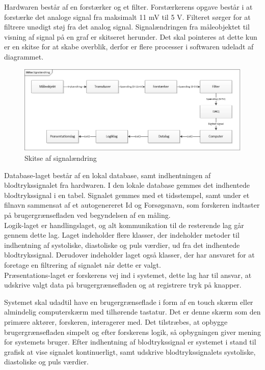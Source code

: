 Hardwaren består af en forstærker og et filter. Forstærkerens opgave består i at forstærke det analoge signal fra maksimalt 11 mV til 5 V. Filteret sørger for at filtrere unødigt støj fra det analog signal. Signalændringen fra måleobjektet til visning af signal på en graf er skitseret herunder. Det skal pointeres at dette kun er en skitse for at skabe overblik, derfor er flere processer i softwaren udeladt af diagrammet. 
\begin{figure}[H]
	\centering
	\includegraphics[width=1.0\textwidth]{Figurer/Signalandring}
	\caption{Skitse af signalændring}
	\label{fig:signalaendring}
\end{figure}
Database-laget består af en lokal database, samt indhentningen af blodtrykssignalet fra hardwaren. I den lokale database gemmes det indhentede blodtrykssignal i en tabel. Signalet gemmes med et tidsstempel, samt under et filnavn sammensat af et autogenereret Id og Forsøgsnavn, som forskeren indtaster på brugergrænsefladen ved begyndelsen af en måling. \\
Logik-laget er handlingslaget, og alt kommunikation til de resterende lag går gennem dette lag. Laget indeholder flere klasser, der indeholder metoder til indhentning af systoliske, diastoliske og puls værdier, ud fra det indhentede blodtrykssignal. Derudover indeholder laget også klasser, der har ansvaret for at foretage en filtrering af signalet når dette er valgt. \\ 
Præsentations-laget er forskerens vej ind i systemet, dette lag har til ansvar, at udskrive valgt data på brugergrænsefladen og at registrere tryk på knapper. 

Systemet skal udadtil have en brugergrænseflade i form af en touch skærm eller almindelig computerskærm med tilhørende tastatur. Det er denne skærm som den primære aktører, forskeren, interagerer med. Det tilstræbes, at opbygge brugergrænsefladen simpelt og efter forskerens logik, så opbygningen giver mening for systemets bruger. Efter indhentning af blodtrykssignal er systemet i stand til grafisk at vise signalet kontinuerligt, samt udskrive blodtrykssignalets systoliske, diastoliske og puls værdier. 

